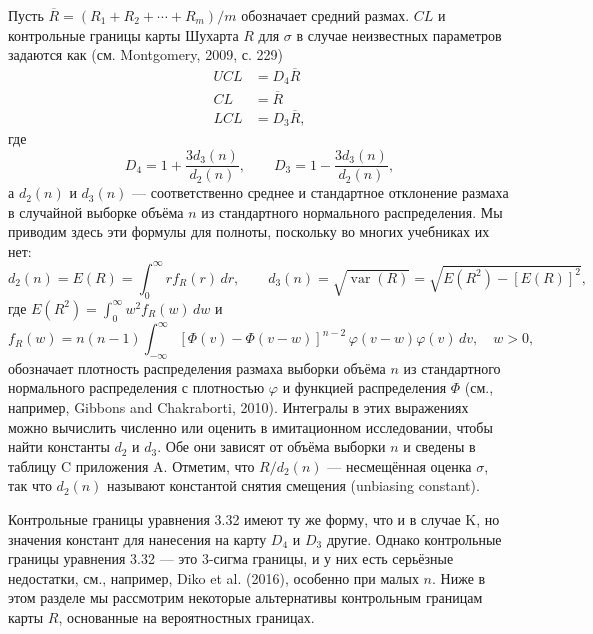 Пусть \(\overline{R} = (R_1 + R_2 + \cdots + R_m)/m\) обозначает средний размах. \(CL\) и контрольные границы карты Шухарта \(R\) для \(\sigma\) в случае неизвестных параметров задаются как (см. Montgomery, 2009, с. 229)
\begin{equation}
	\begin{aligned}
		UCL &= D_4\overline{R} \\
		CL &= \overline{R} \\
		LCL &= D_3\overline{R},
	\end{aligned}
	\label{eq:3.32}
\end{equation}
где
\[
	D_4 = 1 + \frac{3d_3(n)}{d_2(n)}, \qquad D_3 = 1 - \frac{3d_3(n)}{d_2(n)},
\]
а \(d_2(n)\) и \(d_3(n)\) — соответственно среднее и стандартное отклонение размаха в случайной выборке объёма \(n\) из стандартного нормального распределения. Мы приводим здесь эти формулы для полноты, поскольку во многих учебниках их нет:
\[
	d_2(n) = E(R) = \int_0^{\infty} r f_R(r)\,dr, \qquad
	d_3(n) = \sqrt{\operatorname{var}(R)} = \sqrt{E(R^2) - [E(R)]^2},
\]
где \(E(R^2) = \int_0^{\infty} w^2 f_R(w)\,dw\) и
\[
	f_R(w) = n(n - 1)\int_{-\infty}^{\infty} [\Phi(v) - \Phi(v - w)]^{n-2}\,\varphi(v - w)\varphi(v)\,dv,
	\quad w > 0,
\]
обозначает плотность распределения размаха выборки объёма \(n\) из стандартного нормального распределения с плотностью \(\varphi\) и функцией распределения \(\Phi\) (см., например, Gibbons and Chakraborti, 2010). Интегралы в этих выражениях можно вычислить численно или оценить в имитационном исследовании, чтобы найти константы \(d_2\) и \(d_3\). Обе они зависят от объёма выборки \(n\) и сведены в таблицу C приложения A. Отметим, что \(R/d_2(n)\) — несмещённая оценка \(\sigma\), так что \(d_2(n)\) называют константой снятия смещения (unbiasing constant).

Контрольные границы уравнения 3.32 имеют ту же форму, что и в случае K, но значения констант для нанесения на карту \(D_4\) и \(D_3\) другие. Однако контрольные границы уравнения 3.32 — это 3-сигма границы, и у них есть серьёзные недостатки, см., например, Diko et al. (2016), особенно при малых \(n\). Ниже в этом разделе мы рассмотрим некоторые альтернативы контрольным границам карты \(R\), основанные на вероятностных границах.

